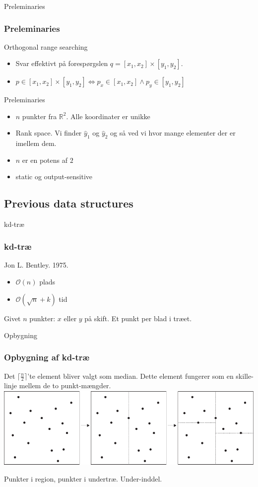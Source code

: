 \documentclass[pdf]{beamer}
\begin{document}
\begin{frame}{Preleminaries}
  \frametitle{Preleminaries}
  Orthogonal range searching
  \begin{itemize}
    \item Svar effektivt på forespørgslen $q = [x_1, x_2] \times [y_1, y_2]$.
    \item $p \in [x_1, x_2] \times [y_1, y_2] \Leftrightarrow p_x \in [x_1, x_2] \wedge p_y \in [y_1, y_2]$
  \end{itemize}

  Preleminaries
  \begin{itemize}

    \item $n$ punkter fra $\mathbb{R}^2$. Alle koordinater er unikke
    \item Rank space. Vi finder $\hat{y}_1$ og $\hat{y}_2$ og så ved vi hvor mange elementer der er imellem dem.
    \item $n$ er en potens af $2$
    \item static og output-sensitive
  \end{itemize}
\end{frame}

\subsection{Previous data structures}

\begin{frame}{kd-træ}
  \frametitle{kd-træ}
  Jon L. Bentley. 1975.
  \begin{itemize}
    \item $\mathcal{O}(n)$ plads
    \item $\mathcal{O}(\sqrt{n} + k)$ tid
  \end{itemize}

  Givet $n$ punkter: $x$ eller $y$ på skift. Et punkt per blad i træet.
\end{frame}

\begin{frame}{Opbygning}
  \frametitle{Opbygning af kd-træ}
  Det $\lceil \frac{n}{2} \rceil$'te element bliver valgt som median. Dette element fungerer som en skille-linje mellem de to punkt-mængder. 
  \includegraphics[scale=0.75]{pictures/kd_subdivision-eps-converted-to.pdf}

    Punkter i region, punkter i undertræ. Under-inddel.
\end{frame}
\end{document}

